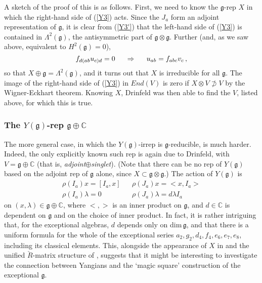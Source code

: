 \documentclass[12pt]{article}
\newcommand{\gf}{\mathfrak{g}}
\newcommand{\cR}{\check{R}}
\begin{document}
A sketch of the proof of this is as follows. First, we need to
know the $\gf$-rep $X$ in which the right-hand side of (\ref{Y3})
acts. Since the $J_a$ form an adjoint representation of $\gf$, it
is clear from (\ref{Y3'}) that the left-hand side of (\ref{Y3}) is
contained in $\Lambda^2(\gf)$, the antisymmetric part of $\gf\otimes
\gf$. Further (and, as we saw above, equivalent to $H^2(\gf)=0$),
\begin{equation} f_{d(ab}u_{c)d}=0 \hspace{0.2in} \Rightarrow \hspace{0.2in}
u_{ab} = f_{abc}v_c \,, \end{equation} so that $X\oplus \gf=\Lambda^2(\gf)$,
and it turns out that $X$ is irreducible for all $\gf$. The image
of the right-hand side of (\ref{Y3}) in $End(V)$ is zero if
$X\otimes V\not\supset V$  by the Wigner-Eckhart theorem. Knowing
$X$, Drinfeld was then able to find the $V$, listed above, for
which this is true.

\subsubsection{The $Y(\gf)$-rep $\gf\oplus{\mathbb C}$}

The more general case, in which the $Y(\gf)$-irrep is
$\gf$-reducible, is much harder. Indeed, the only explicitly known
such rep is again due to Drinfeld, with $V=\gf\oplus{\mathbb C}$
(that is, {\em adjoint}$\oplus${\em singlet}). (Note that there
can be no rep of $Y(\gf)$ based on the adjoint rep of $\gf$ alone,
since $X \subset \gf\otimes \gf$.) The action of $Y(\gf)$ is
\begin{eqnarray}
\nonumber \rho(I_a) x = [I_a,x] &  & \rho(J_a) x = <x,I_a> \\
\label{gplusC}\label{adj} \rho(I_a) \lambda = 0 &  & \rho(J_a)
\lambda = d \lambda I_a
\end{eqnarray}
on $(x,\lambda) \in \gf \oplus {\mathbb C}$, where $<,>$ is an
inner product on $\gf$, and $d \in {\mathbb C}$  is dependent on
$\gf$ and on the choice of inner product. In fact, it is rather
intriguing that, for the exceptional algebras, $d$ depends only on
dim$\,\gf$, and that there is a uniform formula for the whole of
the exceptional series $a_2,g_2,d_4,f_4,e_6,e_7,e_8$, including
its classical elements. This, alongside the appearance of $X$ in
\cite{deligne,cvitanovic} and the unified $\cR$-matrix structure
of \cite{westbury}, suggests that it might be interesting to
investigate the connection between Yangians and the `magic square'
construction of the exceptional $\gf$.
\end{document}
